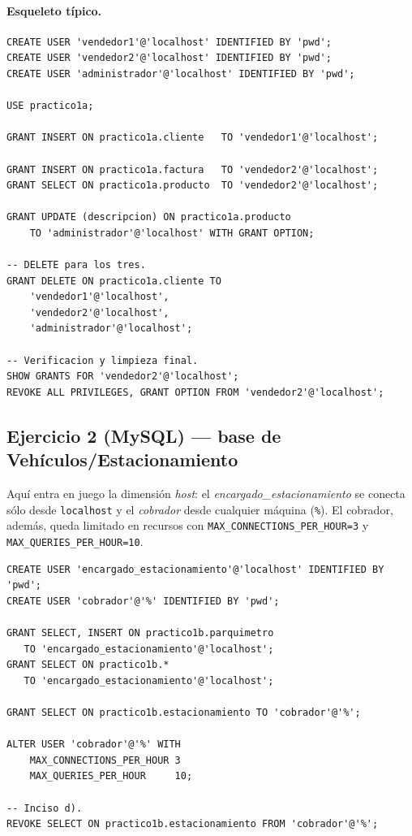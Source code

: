 \documentclass[11pt,a4paper]{article}
\begin{document}
\paragraph{Esqueleto típico.}

\begin{lstlisting}
CREATE USER 'vendedor1'@'localhost' IDENTIFIED BY 'pwd';
CREATE USER 'vendedor2'@'localhost' IDENTIFIED BY 'pwd';
CREATE USER 'administrador'@'localhost' IDENTIFIED BY 'pwd';

USE practico1a;

GRANT INSERT ON practico1a.cliente   TO 'vendedor1'@'localhost';

GRANT INSERT ON practico1a.factura   TO 'vendedor2'@'localhost';
GRANT SELECT ON practico1a.producto  TO 'vendedor2'@'localhost';

GRANT UPDATE (descripcion) ON practico1a.producto
    TO 'administrador'@'localhost' WITH GRANT OPTION;

-- DELETE para los tres.
GRANT DELETE ON practico1a.cliente TO
    'vendedor1'@'localhost',
    'vendedor2'@'localhost',
    'administrador'@'localhost';

-- Verificacion y limpieza final.
SHOW GRANTS FOR 'vendedor2'@'localhost';
REVOKE ALL PRIVILEGES, GRANT OPTION FROM 'vendedor2'@'localhost';
\end{lstlisting}

\subsection*{Ejercicio 2 (MySQL) --- base de Vehículos/Estacionamiento}

Aquí entra en juego la dimensión \emph{host}: el
\emph{encargado\_estacionamiento} se conecta sólo desde
\texttt{localhost} y el \emph{cobrador} desde cualquier máquina
(\texttt{\%}). El cobrador, además, queda limitado en recursos
con \texttt{MAX\_CONNECTIONS\_PER\_HOUR=3} y
\texttt{MAX\_QUERIES\_PER\_HOUR=10}.

\begin{lstlisting}
CREATE USER 'encargado_estacionamiento'@'localhost' IDENTIFIED BY 'pwd';
CREATE USER 'cobrador'@'%' IDENTIFIED BY 'pwd';

GRANT SELECT, INSERT ON practico1b.parquimetro
   TO 'encargado_estacionamiento'@'localhost';
GRANT SELECT ON practico1b.*
   TO 'encargado_estacionamiento'@'localhost';

GRANT SELECT ON practico1b.estacionamiento TO 'cobrador'@'%';

ALTER USER 'cobrador'@'%' WITH
    MAX_CONNECTIONS_PER_HOUR 3
    MAX_QUERIES_PER_HOUR     10;

-- Inciso d).
REVOKE SELECT ON practico1b.estacionamiento FROM 'cobrador'@'%';
\end{lstlisting}
\end{document}
